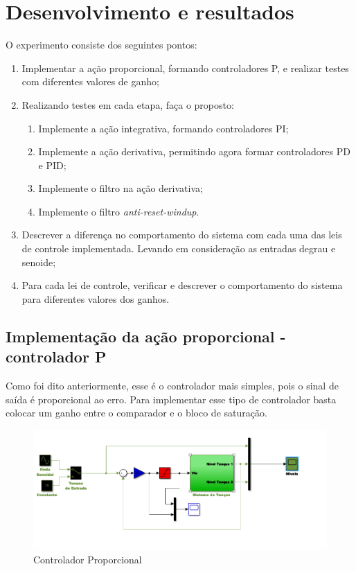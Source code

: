 \documentclass[
	12pt,				%
	openany,			%
	oneside,			%
	a4paper,			%
	english,			%
	french,				%
	spanish,			%
	brazil,				%
	]{abntex2}
\begin{document}
{\chapter{Desenvolvimento e resultados}

O experimento consiste dos seguintes pontos:
\begin{enumerate}
    \item Implementar a ação proporcional, formando controladores P, e realizar testes com diferentes valores de ganho;
    \item Realizando testes em cada etapa, faça o proposto:
    \begin{enumerate}
        \item Implemente a ação integrativa, formando controladores PI;
        \item Implemente a ação derivativa, permitindo agora formar controladores PD e PID;
        \item Implemente o filtro na ação derivativa;
        \item Implemente o filtro \textit{anti-reset-windup}.
    \end{enumerate}
    \item Descrever a diferença no comportamento do sistema com cada uma das leis de controle implementada. Levando em consideração as entradas degrau e senoide;
    \item Para cada lei de controle, verificar e descrever o comportamento do sistema para diferentes valores dos ganhos.
\end{enumerate}
\section{Implementação da ação proporcional - controlador P}

Como foi dito anteriormente, esse é o controlador mais simples, pois o sinal de saída é proporcional ao erro. Para implementar esse tipo de controlador basta colocar um ganho entre o comparador e o bloco de saturação.

\begin{figure}[h]
	\centering
	\includegraphics[scale=0.70]{controlador_p.PNG}
	\caption{Controlador Proporcional}
\end{figure}
\newpage

}
\end{document}
